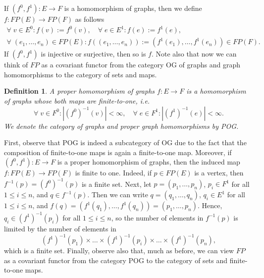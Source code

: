 \documentclass[12pt,times,a4paper]{amsart}
\newtheorem{definition}[theorem]{Definition}
\numberwithin{equation}{section}
\numberwithin{equation}{section}
\begin{document}
If $(f^0,f^1)\colon E\to F$ is a homomorphism of graphs, then we define $f\colon FP(E)\to FP(F)$ as follows
\begin{gather}
\forall\; v\in E^0\colon f(v):=f^0(v),\quad
\forall\; e\in E^1\colon f(e):=f^1(e),\nonumber\\
\forall\; (e_1,\ldots,e_n)\in FP(E)\colon f( (e_1,\ldots,e_n)):= (f^1(e_1),\ldots,f^1(e_n))\in FP(F).
\end{gather}
If $(f^0,f^1)$ is injective or surjective, then so is $f$. Note also that now we can think of $FP$ as a covariant
functor from the category $\mathrm{OG}$ of graphs and graph homomorphisms to the category of sets and maps.


\begin{definition}
A {\em proper homomorphism} of graphs $f\colon E\to F$ is a homomorphism of graphs
whose both maps are finite-to-one, i.e.\
\begin{equation*}
\forall\;v\in F^0\colon |(f^0)^{-1}(v)|<\infty,\quad
\forall\;e\in F^1\colon |(f^1)^{-1}(e)|<\infty.
\end{equation*}
We denote the category of graphs and proper graph homomorphisms by {\rm POG}. 
\end{definition}
\noindent
First, observe that {\rm POG} is indeed a subcategory of {\rm OG} due to the fact that the
 composition of finite-to-one maps is again a 
finite-to-one map. Moreover, if $(f^0,f^1)\colon E\to F$ is a proper homomorphism of
 graphs, then the induced map $f\colon FP(E)\to FP(F)$ is finite to one. Indeed, if $p\in FP(E)$ is a vertex, 
then $f^{-1}(p)=(f^0)^{-1}(p)$ is a finite set. 
Next, let $p=(p_1,\ldots,p_n)$, $p_i\in F^1$ for all $1\leq i\leq n$,  and $q\in f^{-1}(p)$. Then 
we can write $q=(q_1,\ldots,q_n)$, $q_i\in E^1$ for all $1\leq i\leq n$, and
$f(q)=(f^1(q_1),\ldots,f^1(q_n))=(p_1,\ldots,p_n)$. Hence, $q_i\in (f^1)^{-1}(p_i)$ for all $1\leq i\leq n$,
so the number of elements in $f^{-1}(p)$ is limited by the number of elements in 
\begin{equation}\label{finitetoone}
(f^1)^{-1}(p_1)\times\ldots\times (f^1)^{-1}(p_i)\times\ldots\times (f^1)^{-1}(p_n),
\end{equation}
which is a finite set. Finally, observe also that, much as before, 
we can view $FP$ as a covariant functor from the category {\rm POG} to the category of sets and finite-to-one maps.
\end{document}
